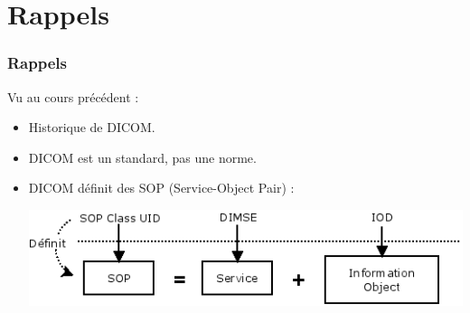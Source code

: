 \section{Rappels}

\frame
{
	\frametitle{Rappels}
	Vu au cours pr\'ec\'edent :
	\begin{itemize}
		\item Historique de DICOM.
		\item DICOM est un standard, pas une norme.
		\item DICOM d\'efinit des SOP (Service-Object Pair) :
		\begin{center}
			\includegraphics[width=\linewidth]{./figures/sop-definition.png}
		\end{center}
	\end{itemize}
}


